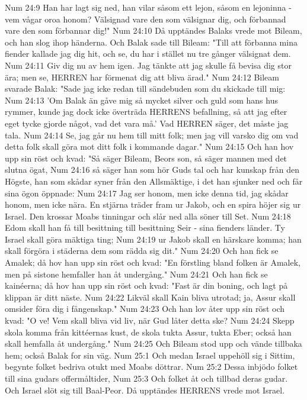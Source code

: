 Num 24:9  Han har lagt sig ned, han vilar såsom ett lejon, såsom en lejoninna - vem vågar oroa honom? Välsignad vare den som välsignar dig, och förbannad vare den som förbannar dig!"
Num 24:10  Då upptändes Balaks vrede mot Bileam, och han slog ihop händerna. Och Balak sade till Bileam: "Till att förbanna mina fiender kallade jag dig hit, och se, du har i stället nu tre gånger välsignat dem.
Num 24:11  Giv dig nu av hem igen. Jag tänkte att jag skulle få bevisa dig stor ära; men se, HERREN har förmenat dig att bliva ärad."
Num 24:12  Bileam svarade Balak: "Sade jag icke redan till sändebuden som du skickade till mig:
Num 24:13  'Om Balak än gåve mig så mycket silver och guld som hans hus rymmer, kunde jag dock icke överträda HERRENS befallning, så att jag efter eget tycke gjorde något, vad det vara må.' Vad HERREN säger, det måste jag tala.
Num 24:14  Se, jag går nu hem till mitt folk; men jag vill varsko dig om vad detta folk skall göra mot ditt folk i kommande dagar."
Num 24:15  Och han hov upp sin röst och kvad: "Så säger Bileam, Beors son, så säger mannen med det slutna ögat,
Num 24:16  så säger han som hör Guds tal och har kunskap från den Högste, han som skådar syner från den Allsmäktige, i det han sjunker ned och får sina ögon öppnade:
Num 24:17  Jag ser honom, men icke denna tid, jag skådar honom, men icke nära. En stjärna träder fram ur Jakob, och en spira höjer sig ur Israel. Den krossar Moabs tinningar och slår ned alla söner till Set.
Num 24:18  Edom skall han få till besittning till besittning Seir - sina fienders länder. Ty Israel skall göra mäktiga ting;
Num 24:19  ur Jakob skall en härskare komma; han skall förgöra i städerna dem som rädda sig dit."
Num 24:20  Och han fick se Amalek; då hov han upp sin röst och kvad: "En förstling bland folken är Amalek, men på sistone hemfaller han åt undergång."
Num 24:21  Och han fick se kainéerna; då hov han upp sin röst och kvad: "Fast är din boning, och lagt på klippan är ditt näste.
Num 24:22  Likväl skall Kain bliva utrotad; ja, Assur skall omsider föra dig i fångenskap."
Num 24:23  Och han lov åter upp sin röst och kvad: "O ve! Vem skall bliva vid liv, när Gud låter detta ske?
Num 24:24  Skepp skola komma från kittéernas kust, de skola tukta Assur, tukta Eber; också han skall hemfalla åt undergång."
Num 24:25  Och Bileam stod upp och vände tillbaka hem; också Balak for sin väg.
Num 25:1  Och medan Israel uppehöll sig i Sittim, begynte folket bedriva otukt med Moabs döttrar.
Num 25:2  Dessa inbjödo folket till sina gudars offermåltider,
Num 25:3  Och folket åt och tillbad deras gudar. Och Israel slöt sig till Baal-Peor. Då upptändes HERRENS vrede mot Israel.
